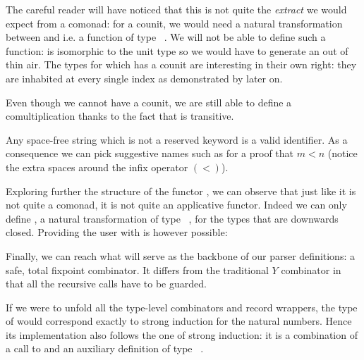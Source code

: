 
 The careful reader will have noticed
that this is not quite the \textit{extract} we would expect from a
comonad: for a counit, we would need a natural transformation
between \BOX{}  and  i.e. a function of type
\mbox{\AF{[} \BOX{}    \AF{]}}. We will not be able
to define such a function: \BOX{}   is isomorphic to
the unit type so we would have to generate an   out
of thin air. The types  for which \BOX{} has a counit are
interesting in their own right: they are inhabited at every single
index as demonstrated by  later on.

\medskip{}

Even though we cannot have a counit, we are still able to define
a comultiplication thanks to the fact that \AF{\_<\_} is transitive.


 Any space-free string which
is not a reserved keyword is a valid identifier. As a consequence
we can pick suggestive names such as  for a proof that $m < n$
(notice the extra spaces around the infix operator $(<)$).

\medskip{}

Exploring further the structure of the functor \BOX{}, we can observe
that just like it is not quite a comonad, it is not quite an applicative
functor. Indeed we can only define , a natural transformation
of type \mbox{\AF{[}   \AR{\BOX{}}  \AF{]}}, for the types 
that are downwards closed. Providing the user with  is however
possible:


Finally, we can reach what will serve as the backbone of our parser
definitions: a safe, total fixpoint combinator. It differs from the
traditional $Y$ combinator in that all the recursive calls have to be
guarded.


If we were to unfold all the type-level combinators and record wrappers,
the type of  would correspond exactly to strong induction for
the natural numbers. Hence its implementation also follows the one of strong
induction: it is a combination of a call to  and an auxiliary
definition  of type \mbox{\AF{[} \AR{\BOX{}}  
 \AF{]}  \AF{[} \AR{\BOX}  \AF{]}}.

